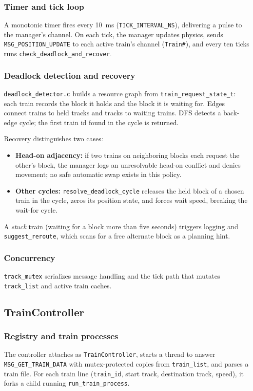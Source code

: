 \documentclass[11pt,a4paper]{article}
\begin{document}
\subsubsection{Timer and tick loop}
A monotonic timer fires every \SI{10}{\milli\second} (\texttt{TICK\_INTERVAL\_NS}), delivering a pulse to the manager's channel. On each tick, the manager updates physics, sends \texttt{MSG\_POSITION\_UPDATE} to each active train's channel (\texttt{Train\#}), and every ten ticks runs \texttt{check\_deadlock\_and\_recover}.

\subsubsection{Deadlock detection and recovery}
\texttt{deadlock\_detector.c} builds a resource graph from \texttt{train\_request\_state\_t}: each train records the block it holds and the block it is waiting for. Edges connect trains to held tracks and tracks to waiting trains. DFS detects a back-edge cycle; the first train id found in the cycle is returned.

Recovery distinguishes two cases:
\begin{itemize}[noitemsep]
  \item \textbf{Head-on adjacency:} if two trains on neighboring blocks each request the other's block, the manager logs an unresolvable head-on conflict and denies movement; no safe automatic swap exists in this policy.
  \item \textbf{Other cycles:} \texttt{resolve\_deadlock\_cycle} releases the held block of a chosen train in the cycle, zeros its position state, and forces wait speed, breaking the wait-for cycle.
\end{itemize}

A \emph{stuck} train (waiting for a block more than five seconds) triggers logging and \texttt{suggest\_reroute}, which scans for a free alternate block as a planning hint.

\subsubsection{Concurrency}
\texttt{track\_mutex} serializes message handling and the tick path that mutates \texttt{track\_list} and active train caches.

\subsection{TrainController}
\subsubsection{Registry and train processes}
The controller attaches as \texttt{TrainController}, starts a thread to answer \texttt{MSG\_GET\_TRAIN\_DATA} with mutex-protected copies from \texttt{train\_list}, and parses a train file. For each train line (\texttt{train\_id}, start track, destination track, speed), it forks a child running \texttt{run\_train\_process}.
\end{document}
